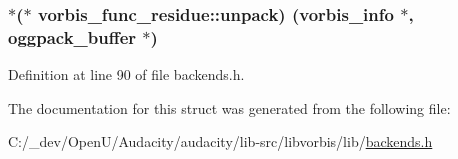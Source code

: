 \subsubsection[{\texorpdfstring{unpack}{unpack}}]{$\ast$($\ast$ vorbis\+\_\+func\+\_\+residue\+::unpack) ({\bf vorbis\+\_\+info} $\ast$, {\bf oggpack\+\_\+buffer} $\ast$)}\hypertarget{structvorbis__func__residue_a8c447251801900acf9830763fc05d98e}{}\label{structvorbis__func__residue_a8c447251801900acf9830763fc05d98e}


Definition at line 90 of file backends.\+h.



The documentation for this struct was generated from the following file\+:\begin{DoxyCompactItemize}
\item 
C\+:/\+\_\+dev/\+Open\+U/\+Audacity/audacity/lib-\/src/libvorbis/lib/\hyperlink{backends_8h}{backends.\+h}\end{DoxyCompactItemize}
